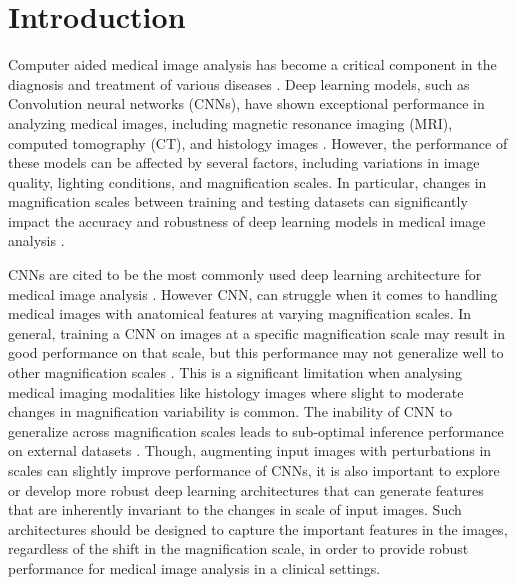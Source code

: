 \documentclass[nohyperref]{article}
\theoremstyle{plain}
\theoremstyle{definition}
\theoremstyle{remark}
\begin{document}
\section{Introduction}
\label{submission}
Computer aided medical image analysis has become a critical component in the diagnosis and treatment of various diseases \cite{chakraborty2023overview,duncan2000medical}. Deep learning models, such as Convolution neural networks (CNNs), have shown exceptional performance in analyzing medical images, including magnetic resonance imaging (MRI), computed tomography (CT), and histology images \cite{chan2020deep}. However, the performance of these models can be affected by several factors, including variations in image quality, lighting conditions, and magnification scales. In particular, changes in magnification scales between training and testing datasets can significantly impact the accuracy and robustness of deep learning models in medical image analysis \cite{gupta2017breast}.







CNNs are cited to be the most commonly used deep learning architecture for medical image analysis \cite{li2014medical}. However CNN, can struggle when it comes to handling medical images with anatomical features at varying magnification scales. In general, training a CNN on images at a specific magnification scale may result in good performance on that scale, but this performance may not generalize well to other magnification scales \cite{alkassar2021going}. This is a significant limitation when analysing medical imaging modalities like histology images where slight to moderate changes in magnification variability is common. The inability of CNN to generalize across magnification scales leads to sub-optimal inference performance on external datasets \cite{gupta2017breast}. Though, augmenting input images with perturbations in scales can slightly improve performance of CNNs, it is also important to explore or develop more robust deep learning architectures that can generate features that are inherently invariant to the changes in scale of input images. Such architectures should be designed to capture the important features in the images, regardless of the shift in the magnification scale, in order to provide robust performance for medical image analysis in a clinical settings. 
\end{document}
